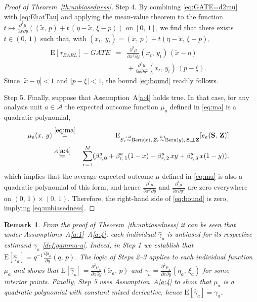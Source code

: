 \documentclass[sigconf]{acmart}
\newtheorem{remark}{Remark}
\newcommand{\E}{\mathrm E}
\newcommand{\iidsim}{{\stackrel{\mathrm{iid}}{\sim}}}
\newcommand{\ind}{\perp\!\!\!\perp}
\begin{document}
\begin{proof}[Proof of Theorem~\ref{th:unbiasedness}]
Step 4. By combining \eqref{eq:GATE=d2mu} with \eqref{eq:EhatTau} and applying the mean-value theorem to the function $t\mapsto \frac{\partial^2\mu}{\partial x\partial y}\left((\tilde x,\,p) + t\,(\eta-\tilde x,\,\xi - p)\right)$ on $[0,\,1]$, we find that there exists $t\in(0,\,1)$ such that, with $(x_t,\,y_t) = (\tilde x,\,p) + t(\eta - \tilde x,\,\xi - p)$,
\begin{eqnarray*}
    \E[\hat\tau_{EARL}] - GATE &=& \frac{\partial^3\mu}{\partial x^2\partial y}(x_t,\,y_t)\,(\tilde x-\eta) \nonumber\\ &&{}+ \frac{\partial^3\mu}{\partial x\partial y^2}(x_t,\,y_t)\,(p-\xi).
\end{eqnarray*}
Since $|\tilde x-\eta| < 1$ and $|p-\xi| < 1$, the bound \eqref{eq:bound} readily follows.

Step 5. Finally, suppose that Assumption~A\ref{a:4} holds true. In that case, for any analysis unit $a\in\mathcal A$ the expected outcome function $\mu_a$ defined in \eqref{eq:ma} is a quadratic polynomial,
\begin{eqnarray*}
    \mu_a(x,\,y) &\stackrel{\eqref{eq:ma}}{=}& \E_{S_r\iidsim \mathrm{Bern}(x),\,Z_r\iidsim \mathrm{Bern}(y),\,\mathbf S\ind \mathbf Z}[e_a(\mathbf S,\,\mathbf Z)] \\
    &\stackrel{A\ref{a:4}}{=}& \sum_{r=1}^M(\beta^a_{r,\,0} + \beta^a_{r,\,1}(1-x) + \beta^a_{r,\,2}\, xy + \beta^a_{r,\,3}\,x(1-y)),
\end{eqnarray*}
which implies that the average expected outcome $\mu$ defined in \eqref{eq:mu} is also a quadratic polynomial of this form, and hence $\frac{\partial^3\mu}{\partial x^2\partial y}$ and $\frac{\partial^3\mu}{\partial x\partial y^2}$ are zero everywhere on $(0,\,1)\times (0,\,1)$. Therefore, the right-hand side of \eqref{eq:bound} is zero, implying \eqref{eq:unbiasedness}.
\end{proof}

\begin{remark}\label{rmk:unbiasedness}
    \textup{
    From the proof of Theorem~\ref{th:unbiasedness} it can be seen that under Assumptions~A\ref{a:1}--A\ref{a:4}, each individual $\hat\gamma_a$ is unbiased for its respective estimand $\gamma_a$ \eqref{def:gamma-a}. Indeed, in Step 1 we establish that $\E[\hat\gamma_a] = q^{-1}\frac{\partial\mu_a}{\partial y}(q,\,p)$. The logic of Steps 2--3 applies to each individual function $\mu_a$ and shows that $\E[\hat\gamma_a] = \frac{\partial^2\mu_a}{\partial x \partial y}(\tilde x_a,\,p)$ and $\gamma_a = \frac{\partial^2\mu_a}{\partial x \partial y}(\eta_a,\,\xi_a)$ for some interior points. Finally, Step 5 uses Assumption~A\ref{a:4} to show that $\mu_a$ is a quadratic polynomial with constant mixed derivative, hence $\E[\hat\gamma_a] = \gamma_a$.}
\end{remark}
\end{document}
